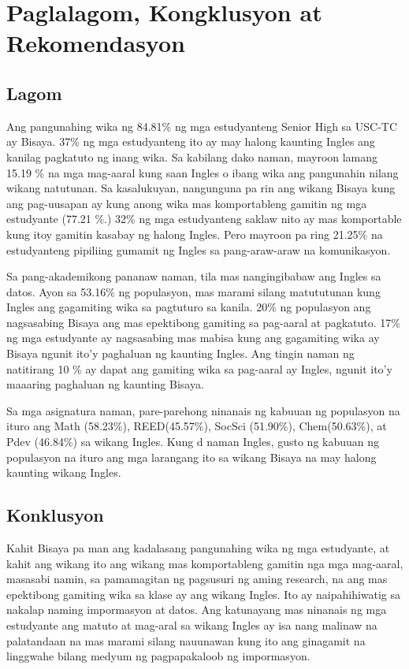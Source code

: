 \documentclass [11pt] {report}
\begin{document}
\chapter{Paglalagom, Kongklusyon at Rekomendasyon}
\section{Lagom}
Ang pangunahing wika ng 84.81\% ng mga estudyanteng Senior High sa USC-TC ay
Bisaya. 37\% ng mga estudyanteng ito ay may halong kaunting Ingles ang kanilag
pagkatuto ng inang wika. Sa kabilang dako naman, mayroon lamang 15.19 \% na mga
mag-aaral kung saan Ingles o ibang wika ang pangunahin nilang wikang natutunan.
Sa kasalukuyan, nangunguna pa rin ang wikang Bisaya kung ang pag-uusapan ay kung
anong wika mas komportableng gamitin ng mga estudyante (77.21 \%.) 32\% ng mga
estudyanteng saklaw nito ay mas komportable kung itoy gamitin kasabay ng halong
Ingles. Pero mayroon pa ring 21.25\% na estudyanteng pipiliing gumamit ng Ingles
sa pang-araw-araw na komunikasyon.

Sa pang-akademikong pananaw naman, tila mas nangingibabaw ang Ingles sa datos.
Ayon sa 53.16\% ng populasyon, mas marami silang matututunan kung Ingles ang
gagamiting wika sa pagtuturo sa kanila. 20\% ng populasyon ang nagsasabing
Bisaya ang mas epektibong gamiting sa pag-aaral at pagkatuto. 17\% ng mga
estudyante ay nagsasabing mas mabisa kung ang gagamiting wika ay Bisaya ngunit
ito'y paghaluan ng kaunting Ingles. Ang tingin naman ng natitirang 10 \% ay
dapat ang gamiting wika sa pag-aaral ay Ingles, ngunit ito'y maaaring paghaluan
ng kaunting Bisaya.

Sa mga asignatura naman, pare-parehong ninanais ng kabuuan ng populasyon na
ituro ang Math (58.23\%), REED(45.57\%), SocSci (51.90\%), Chem(50.63\%), at
Pdev (46.84\%) sa wikang Ingles. Kung d naman Ingles, gusto ng kabuuan ng
populasyon na ituro ang mga larangang ito sa wikang Bisaya na may halong
kaunting wikang Ingles.
\section{Konklusyon}
Kahit Bisaya pa man ang kadalasang pangunahing wika ng mga estudyante, at kahit
ang wikang ito ang wikang mas komportableng gamitin nga mga mag-aaral, masasabi
namin, sa pamamagitan ng pagsusuri ng aming research, na ang mas epektibong
gamiting wika sa klase ay ang wikang Ingles. Ito ay naipahihiwatig sa nakalap
naming impormasyon at datos. Ang katunayang mas ninanais ng mga estudyante ang
matuto at mag-aral sa wikang Ingles ay isa nang malinaw na palatandaan na mas
marami silang nauunawan kung ito ang ginagamit na linggwahe bilang medyum ng
pagpapakaloob ng impormasyon.
\end{document}
